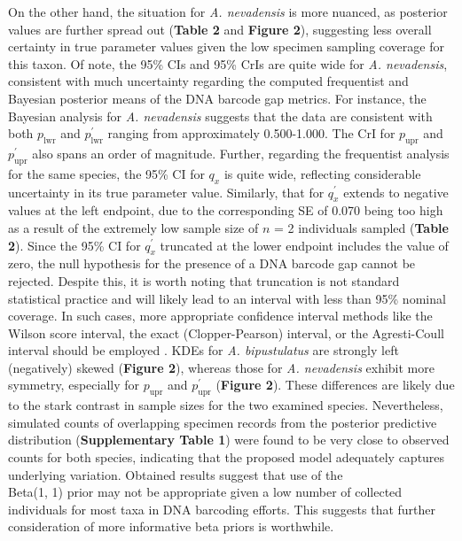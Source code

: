 \documentclass[12pt]{article}
\begin{document}
\noindent On the other hand, the situation for \textit{A. nevadensis} is more nuanced, as posterior values are further spread out (\textbf{Table 2} and \textbf{Figure 2}), suggesting less overall certainty in true parameter values given the low specimen sampling coverage for this taxon. Of note, the 95\% CIs and 95\% CrIs are quite wide for \textit{A. nevadensis}, consistent with much uncertainty regarding the computed frequentist and Bayesian posterior means of the DNA barcode gap metrics. For instance, the Bayesian analysis for \textit{A. nevadensis} suggests that the data are consistent with both $p_{\mathrm{lwr}}$ and $p^{'}_{\mathrm{lwr}}$ ranging from approximately 0.500-1.000. The CrI for $p_{\mathrm{upr}}$ and $p^{'}_{\mathrm{upr}}$ also spans an order of magnitude. Further, regarding the frequentist analysis for the same species, the 95\% CI for $q_x$ is quite wide, reflecting considerable uncertainty in its true parameter value. Similarly, that for $q^{'}_x$ extends to negative values at the left endpoint, due to the corresponding SE of 0.070 being too high as a result of the extremely low sample size of $n$ = 2 individuals sampled (\textbf{Table 2}). Since the 95\% CI for $q^{'}_x$ truncated at the lower endpoint includes the value of zero, the null hypothesis for the presence of a DNA barcode gap cannot be rejected. Despite this, it is worth noting that truncation is not standard statistical practice and will likely lead to an interval with less than 95\% nominal coverage. In such cases, more appropriate confidence interval methods like the Wilson score interval, the exact (Clopper-Pearson) interval, or the Agresti-Coull interval should be employed \citep{newcombe1998confidence, agresti1998approximate}. KDEs for \textit{A. bipustulatus} are strongly left (negatively) skewed (\textbf{Figure 2}), whereas those for \textit{A. nevadensis} exhibit more symmetry, especially for $p_{\mathrm{upr}}$ and $p^{'}_{\mathrm{upr}}$ (\textbf{Figure 2}). These differences are likely due to the stark contrast in sample sizes for the two examined species. Nevertheless, simulated counts of overlapping specimen records from the posterior predictive distribution (\textbf{Supplementary Table 1}) were found to be very close to observed counts for both species, indicating that the proposed model adequately captures underlying variation. Obtained results suggest that use of the \\ Beta(1, 1) prior may not be appropriate given a low number of collected individuals for most taxa in DNA barcoding efforts. This suggests that further consideration of more informative beta priors is worthwhile. 
\end{document}
